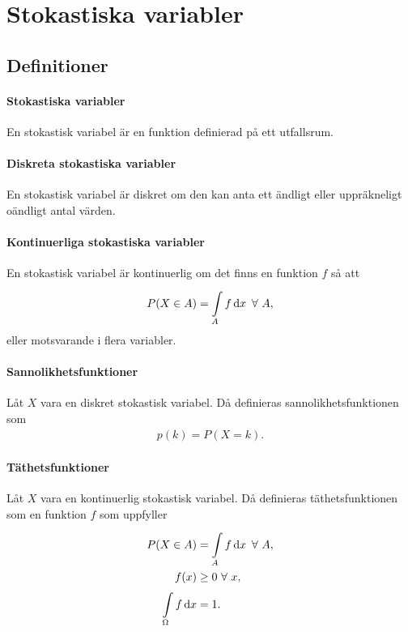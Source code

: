 \section{Stokastiska variabler}

\subsection{Definitioner}

\paragraph{Stokastiska variabler}
En stokastisk variabel är en funktion definierad på ett utfallsrum.

\paragraph{Diskreta stokastiska variabler}
En stokastisk variabel är diskret om den kan anta ett ändligt eller uppräkneligt oändligt antal värden.

\paragraph{Kontinuerliga stokastiska variabler}
En stokastisk variabel är kontinuerlig om det finns en funktion $f$ så att
\begin{align*}
	P(X\in A) = \int\limits_{A}^{}f\dd{x}\ \forall\ A,
\end{align*}
eller motsvarande i flera variabler.

\paragraph{Sannolikhetsfunktioner}
Låt $X$ vara en diskret stokastisk variabel. Då definieras sannolikhetsfunktionen som
\begin{align*}
	p(k) = P(X = k).
\end{align*}

\paragraph{Täthetsfunktioner}
Låt $X$ vara en kontinuerlig stokastisk variabel. Då definieras täthetsfunktionen som en funktion $f$ som uppfyller
\begin{align*}
	P(X\in A)          &= \int\limits_{A}^{}f\dd{x}\ \forall\ A, \\
	f(x)               &\geq 0\ \forall\ x, \\
	\int\limits_{\Omega}^{}f\dd{x} &= 1.
\end{align*}

